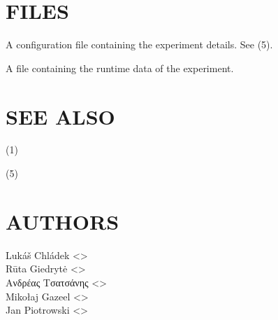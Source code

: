 \documentclass[a4paper,english]{article}
\begin{document}
\begin{adjustwidth}{18pt}{0pt}
    \section{FILES}

        \begin{Description}[Files]\setlength{\itemsep}{0cm}
            \item[\File{gourd.toml}] A configuration file containing the experiment details. See (5).
            \item[\File{<experiment-dir>/<experiment-number>.lock}] A file containing the runtime data of the experiment.
        \end{Description}

    \section{SEE ALSO}

        (1)

        (5)

    \section{AUTHORS}
    Lukáš Chládek <>\\[0.1cm]\MANbr
    Rūta Giedrytė <>\\[0.1cm]\MANbr
    Ανδρέας Τσατσάνης <>\\[0.1cm]\MANbr
    Mikołaj Gazeel <>\\[0.1cm]\MANbr
    Jan Piotrowski <>
\end{adjustwidth}
\end{document}

